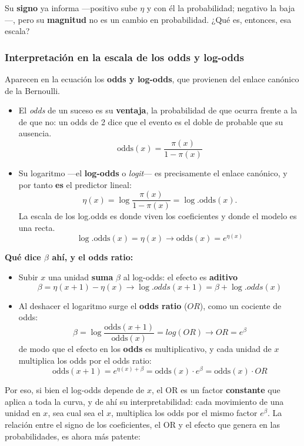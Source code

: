 \documentclass[
  letterpaper,
  DIV=11,
  numbers=noendperiod]{scrartcl}
\providecommand{\tightlist}{%
  \setlength{\itemsep}{0pt}\setlength{\parskip}{0pt}}\usepackage{longtable,booktabs,array}
\begin{document}
Su \textbf{signo} ya informa ---positivo sube \(\eta\) y con él la
probabilidad; negativo la baja---, pero su \textbf{magnitud} no es un
cambio en probabilidad. ¿Qué es, entonces, esa escala?

\hypertarget{interpretaciuxf3n-en-la-escala-de-los-odds-y-log-odds}{%
\subsubsection{Interpretación en la escala de los odds y
log-odds}\label{interpretaciuxf3n-en-la-escala-de-los-odds-y-log-odds}}

Aparecen en la ecuación los \textbf{odds y log-odds}, que provienen del
enlace canónico de la Bernoulli.

\begin{itemize}
\tightlist
\item
  El \emph{odds} de un suceso es su \textbf{ventaja}, la probabilidad de
  que ocurra frente a la de que no: un odds de 2 dice que el evento es
  el doble de probable que su ausencia.
  \[\text{odds}(x)=\frac{\pi(x)}{1-\pi(x)}\]
\item
  Su logaritmo ---el \textbf{log-odds} o \emph{logit}--- es precisamente
  el enlace canónico, y por tanto \textbf{es} el predictor lineal:
  \[\eta(x)=\log\frac{\pi(x)}{1-\pi(x)}=\log.\text{odds}(x).\] La escala
  de los log.odds es donde viven los coeficientes y donde el modelo es
  una recta.
  \[ \log.\text{odds}(x)=\eta(x) \rightarrow \text{odds}(x)=e^{\eta(x)}\]
\end{itemize}

\textbf{Qué dice \(\beta\) ahí, y el odds ratio:}

\begin{itemize}
\tightlist
\item
  Subir \(x\) una unidad \textbf{suma} \(\beta\) al log-odds: el efecto
  es \textbf{aditivo}
  \[\beta=\eta(x+1)-\eta(x) \rightarrow \log.odds(x+1)= \beta +\log.odds(x)\]
\item
  Al deshacer el logaritmo surge el \textbf{odds ratio} (\(OR\)), como
  un cociente de odds:
  \[\beta=\log\frac{\text{odds}(x+1)}{\text{odds}(x)} = log(OR) \rightarrow OR=e^{\beta}\]
  de modo que el efecto en los \textbf{odds} es multiplicativo, y cada
  unidad de \(x\) multiplica los odds por el odds ratio:
  \[\text{odds}(x+1)=e^{\eta(x)+\beta} = \text{odds}(x) \cdot e^{\beta}= \text{odds}(x) \cdot OR\]
\end{itemize}

Por eso, si bien el log-odds depende de \(x\), el OR es un factor
\textbf{constante} que aplica a toda la curva, y de ahí su
interpretabilidad: cada movimiento de una unidad en \(x\), sea cual sea
el \(x\), multiplica los odds por el mismo factor \(e^{\beta}\). La
relación entre el signo de los coeficientes, el OR y el efecto que
genera en las probabilidades, es ahora más patente:
\end{document}
